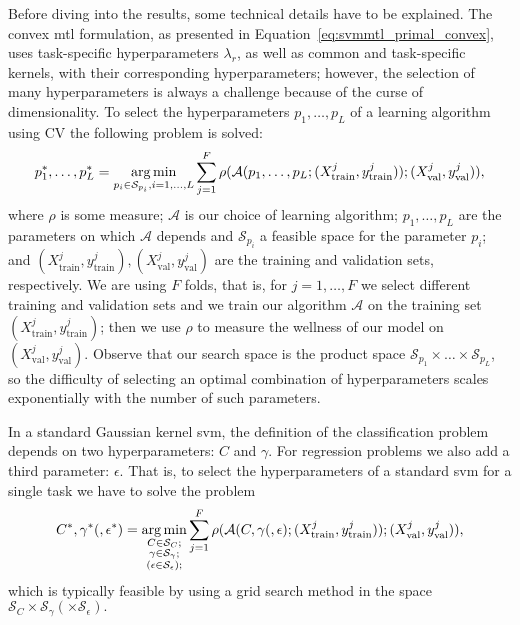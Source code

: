 Before diving into the results, some technical details have to be explained. The convex \acrshort{mtl} formulation, as presented in Equation~\eqref{eq:svmmtl_primal_convex}, uses task-specific hyperparameters $\lambda_r$, as well as common and task-specific kernels, with their corresponding hyperparameters; however, the selection of many hyperparameters is always a challenge because of the curse of dimensionality. 
%
To select the hyperparameters $p_1, \ldots, p_L$ of a learning algorithm using CV the following problem is solved:
\begin{equation}
    \label{eq:hp-selection_general}
    p_1^*, \ldots, p_L^* = \argmin_{p_i \in \mathcal{S}_{p_i}, i=1, \ldots, L} \sum_{j=1}^{F} \rho(\mathcal{A}(p_1, \ldots, p_L; (X^j_\text{train}, y^j_\text{train})); (X^j_\text{val}, y^j_\text{val})) ,
\end{equation}
where $\rho$ is some measure; $\mathcal{A}$ is our choice of learning algorithm; $p_1, \ldots, p_L$ are the parameters on which $\mathcal{A}$ depends and $\mathcal{S}_{p_i}$ a feasible space for the parameter $p_i$; and $(X^j_\text{train}, y^j_\text{train}), (X^j_\text{val}, y^j_\text{val})$ are the training and validation sets, respectively. We are using $F$ folds, that is, for $j=1, \ldots, F$ we select different training and validation sets and we train our algorithm $\mathcal{A}$ on the training set $(X^j_\text{train}, y^j_\text{train})$; then we use $\rho$ to measure the wellness of our model on $(X^j_\text{val}, y^j_\text{val})$. 
%
Observe that our search space is the product space $\mathcal{S}_{p_1} \times \ldots \times \mathcal{S}_{p_L}$, so the difficulty of selecting an optimal combination of hyperparameters scales exponentially with the number of such parameters.

%
In a standard Gaussian kernel \acrshort{svm}, the definition of the classification problem depends on two hyperparameters: $C$ and $\gamma$.
For regression problems we also add a third parameter: $\epsilon$. 
That is, to select the hyperparameters of a standard \acrshort{svm} for a single task we have to solve the problem
\begin{equation}
    \nonumber
    C^*, \gamma^* (, \epsilon^*) = \operatorname*{arg\min}_{\substack{C \in \mathcal{S}_C ; \\ \substack{\gamma \in \mathcal{S}_\gamma} ; \\ \left(\substack{\epsilon \in \mathcal{S}_\epsilon} \right); }}
     \sum_{j=1}^{F} \rho(\mathcal{A}(C, \gamma (, \epsilon); (X^j_\text{train}, y^j_\text{train})); (X^j_\text{val}, y^j_\text{val})) ,
\end{equation}
which is typically feasible by using a grid search method in the space $\mathcal{S}_{C} \times \mathcal{S}_{\gamma} (\times \mathcal{S}_{\epsilon}) .$
%

